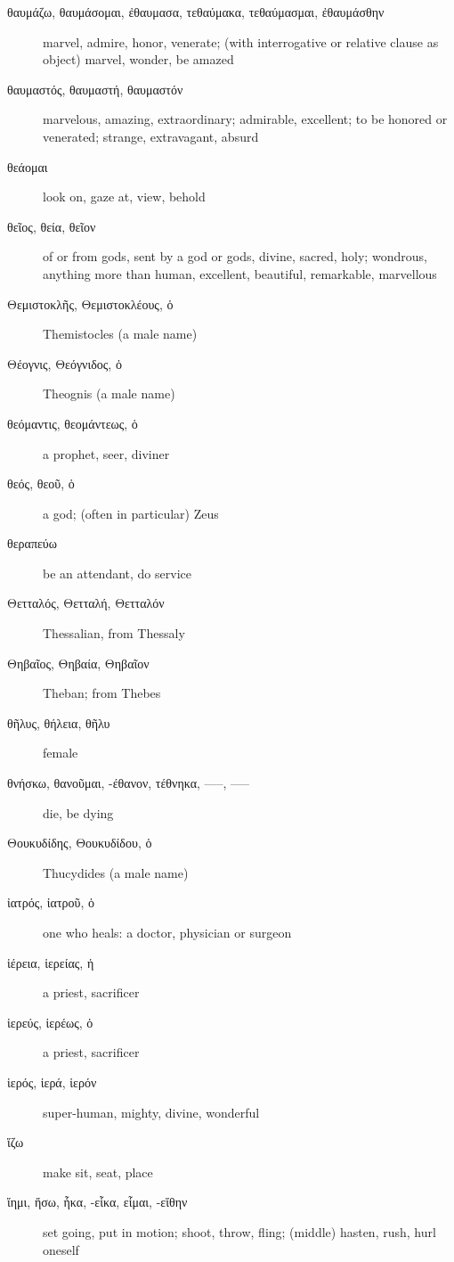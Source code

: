 \documentclass[12pt,letterpaper]{article}
\begin{document}
\begin{description}
    \item[\textgreek{θαυμάζω, θαυμάσομαι, ἐθαυμασα, τεθαύμακα, τεθαύμασμαι, ἐθαυμάσθην}] \marginnote{*}marvel, admire, honor, venerate; (with interrogative or relative clause as object) marvel, wonder, be amazed
    \item[\textgreek{θαυμαστός, θαυμαστή, θαυμαστόν}] marvelous, amazing, extraordinary; admirable, excellent; to be honored or venerated; strange, extravagant, absurd
    \item[\textgreek{θεάομαι}] look on, gaze at, view, behold
    \item[\textgreek{θεῖος, θεία, θεῖον}] \marginnote{*}of or from gods, sent by a god or gods, divine, sacred, holy; wondrous, anything more than human, excellent, beautiful, remarkable, marvellous
    \item[\textgreek{Θεμιστοκλῆς, Θεμιστοκλέους, ὁ}] Themistocles (a male name)
    \item[\textgreek{Θέογνις, Θεόγνιδος, ὁ}] Theognis (a male name)
    \item[\textgreek{θεόμαντις, θεομάντεως, ὁ}] a prophet, seer, diviner
    \item[\textgreek{θεός, θεοῦ, ὁ}] \marginnote{*}a god; (often in particular) Zeus
    \item[\textgreek{θεραπεύω}] be an attendant, do service
    \item[\textgreek{Θετταλός, Θετταλή, Θετταλόν}] Thessalian, from Thessaly
    \item[\textgreek{Θηβαῖος, Θηβαία, Θηβαῖον}] Theban; from Thebes
    \item[\textgreek{θῆλυς, θήλεια, θῆλυ}] female
    \item[\textgreek{θνήσκω, θανοῦμαι, -έθανον, τέθνηκα, –––, –––}] \marginnote{*}die, be dying
    \item[\textgreek{Θουκυδίδης, Θουκυδίδου, ὁ}] Thucydides (a male name)
    \item[\textgreek{ἰατρός, ἰατροῦ, ὁ}] one who heals: a doctor, physician or surgeon
    \item[\textgreek{ἱέρεια, ἱερείας, ἡ}] a priest, sacrificer
    \item[\textgreek{ἱερεύς, ἱερέως, ὁ}] a priest, sacrificer
    \item[\textgreek{ἱερός, ἱερά, ἱερόν}] \marginnote{*}super-human, mighty, divine, wonderful
    \item[\textgreek{ἵζω}] make sit, seat, place
    \item[\textgreek{ἵημι, ἥσω, ἧκα, -εἷκα, εἷμαι, -εἵθην}] \marginnote{*}set going, put in motion; shoot, throw, fling; (middle) hasten, rush, hurl oneself

\end{description}
\end{document}
